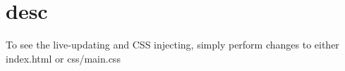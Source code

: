 \chapter{desc}
\hypertarget{md__d_1_2_g_i_t_2_food_link_2foodlink_8client_2node__modules_2bs-recipes_2recipes_2server_2desc}{}\label{md__d_1_2_g_i_t_2_food_link_2foodlink_8client_2node__modules_2bs-recipes_2recipes_2server_2desc}
To see the live-\/updating and CSS injecting, simply perform changes to either {\ttfamily index.\+html} or {\ttfamily css/main.\+css} 